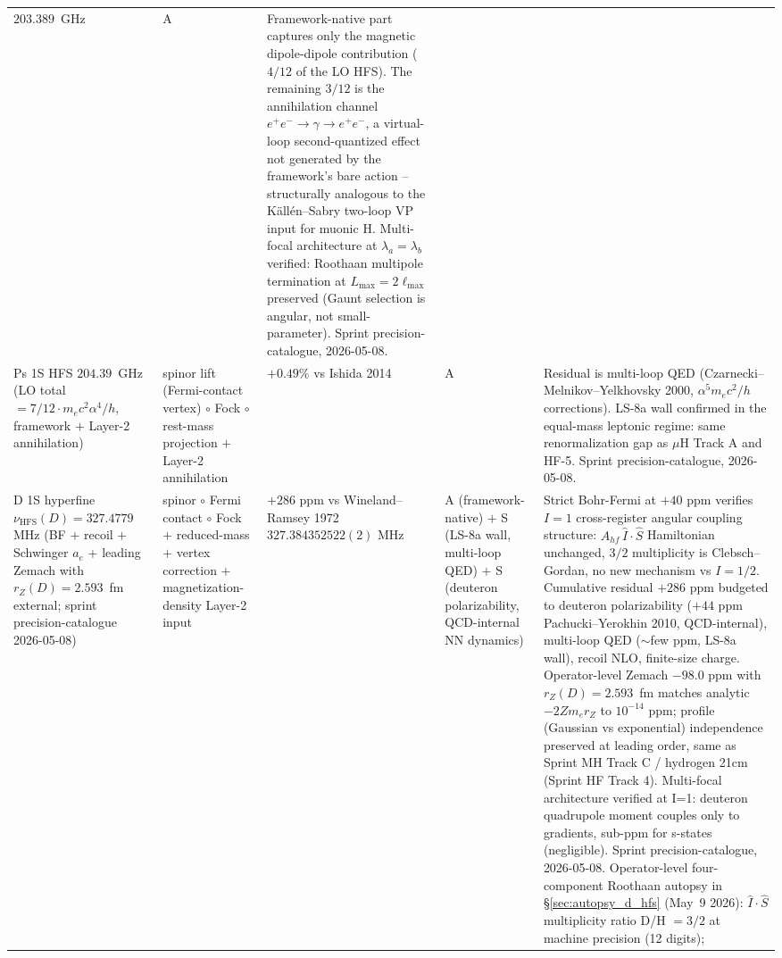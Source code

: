 \documentclass[11pt]{article}
\begin{document}
\begin{table}[h]
\begin{tabular}{p{3.8cm} p{2.5cm} p{1.5cm} p{1.4cm} p{4.5cm}}
$203.389$~GHz & A & Framework-native part captures only the magnetic
dipole-dipole contribution ($4/12$ of the LO HFS).  The
remaining $3/12$ is the annihilation channel $e^+e^- \to \gamma \to e^+e^-$,
a virtual-loop second-quantized effect not generated by the framework's
bare action -- structurally analogous to the K\"all\'en--Sabry two-loop
VP input for muonic H. Multi-focal architecture at $\lambda_a = \lambda_b$
verified: Roothaan multipole termination at $L_\text{max} = 2 \ell_\text{max}$
preserved (Gaunt selection is angular, not small-parameter).
Sprint precision-catalogue, 2026-05-08. \\
Ps 1S HFS $204.39$~GHz (LO total $= 7/12 \cdot m_e c^2 \alpha^4 / h$,
framework $+$ Layer-2 annihilation) & spinor lift (Fermi-contact vertex)
$\circ$ Fock $\circ$ rest-mass projection $+$ Layer-2 annihilation &
$+0.49\%$ vs Ishida 2014 & A & Residual is multi-loop QED
(Czarnecki--Melnikov--Yelkhovsky 2000, $\alpha^5 m_e c^2/h$ corrections).
LS-8a wall confirmed in the equal-mass leptonic regime: same
renormalization gap as $\mu$H Track A and HF-5.  Sprint precision-catalogue,
2026-05-08. \\
D 1S hyperfine $\nu_\text{HFS}(D) = 327.4779$ MHz (BF $+$ recoil
$+$ Schwinger $a_e$ $+$ leading Zemach with $r_Z(D) = 2.593$~fm
external; sprint precision-catalogue 2026-05-08) & spinor $\circ$ Fermi
contact $\circ$ Fock $+$ reduced-mass $+$ vertex correction
$+$ magnetization-density Layer-2 input
& $+286$ ppm vs Wineland--Ramsey 1972 $327.384352522(2)$ MHz & A
(framework-native) $+$ S (LS-8a wall, multi-loop QED) $+$ S (deuteron
polarizability, QCD-internal NN dynamics)
& Strict Bohr-Fermi at $+40$ ppm verifies $I=1$ cross-register angular
coupling structure: $A_{hf}\,\hat{I}\cdot\hat{S}$ Hamiltonian unchanged,
$3/2$ multiplicity is Clebsch--Gordan, no new mechanism vs $I=1/2$.
Cumulative residual $+286$ ppm budgeted to deuteron polarizability
($+44$ ppm Pachucki--Yerokhin 2010, QCD-internal), multi-loop QED
($\sim$few ppm, LS-8a wall), recoil NLO, finite-size charge.
Operator-level Zemach $-98.0$ ppm with $r_Z(D) = 2.593$~fm matches
analytic $-2 Z m_e r_Z$ to $10^{-14}$ ppm; profile (Gaussian vs
exponential) independence preserved at leading order, same as Sprint MH
Track C / hydrogen 21cm (Sprint HF Track 4).  Multi-focal architecture
verified at I=1: deuteron quadrupole moment couples only to gradients,
sub-ppm for s-states (negligible).  Sprint precision-catalogue,
2026-05-08.  Operator-level four-component Roothaan autopsy in
\S\ref{sec:autopsy_d_hfs} (May~9 2026): $\hat{I}\cdot\hat{S}$
multiplicity ratio D/H $= 3/2$ at machine precision (12 digits);

\end{tabular}
\end{table}
\end{document}

